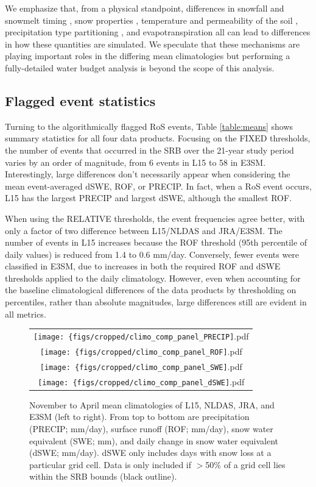 \documentclass[nhess, manuscript]{copernicus}
\begin{document}
We emphasize that, from a physical standpoint, differences in snowfall and snowmelt timing \citep{rauscher2008future,mccabe2005trends}, snow properties \citep{brown2006evaluation}, temperature and permeability of the soil \citep{niu2006effects}, precipitation type partitioning \citep{knowles2006trends}, and evapotranspiration \citep{zheng2019on} all can lead to differences in how these quantities are simulated.
We speculate that these mechanisms are playing important roles in the differing mean climatologies but performing a fully-detailed water budget analysis is beyond the scope of this analysis.

\subsection{Flagged event statistics}

Turning to the algorithmically flagged RoS events, Table \ref{table:means} shows summary statistics for all four data products.
Focusing on the FIXED thresholds, the number of events that occurred in the SRB over the 21-year study period varies by an order of magnitude, from 6 events in L15 to 58 in E3SM.
Interestingly, large differences don't necessarily appear when considering the mean event-averaged dSWE, ROF, or PRECIP.
In fact, when a RoS event occurs, L15 has the largest PRECIP and largest dSWE, although the smallest ROF.

When using the RELATIVE thresholds, the event frequencies agree better, with only a factor of two difference between L15/NLDAS and JRA/E3SM.
The number of events in L15 increases because the ROF threshold (95th percentile of daily values) is reduced from 1.4 to 0.6 mm/day.
Conversely, fewer events were classified in E3SM, due to increases in both the required ROF and dSWE thresholds applied to the daily climatology.
However, even when accounting for the baseline climatological differences of the data products by thresholding on percentiles, rather than absolute magnitudes, large differences still are evident in all metrics.

\begin{figure}
\begin{tabular}{c}
\texttt{[image: \{figs/cropped/climo\_comp\_panel\_PRECIP]}.pdf} \\
\texttt{[image: \{figs/cropped/climo\_comp\_panel\_ROF]}.pdf} \\
\texttt{[image: \{figs/cropped/climo\_comp\_panel\_SWE]}.pdf} \\
\texttt{[image: \{figs/cropped/climo\_comp\_panel\_dSWE]}.pdf}
\end{tabular}
\caption{November to April mean climatologies of L15, NLDAS, JRA, and E3SM (left to right). From top to bottom are precipitation (PRECIP; mm/day), surface runoff (ROF; mm/day), snow water equivalent (SWE; mm), and daily change in snow water equivalent (dSWE; mm/day). dSWE only includes days with snow loss at a particular grid cell. Data is only included if $>$50\% of a grid cell lies within the SRB bounds (black outline).}
\label{fig:means}
\end{figure}
\end{document}
